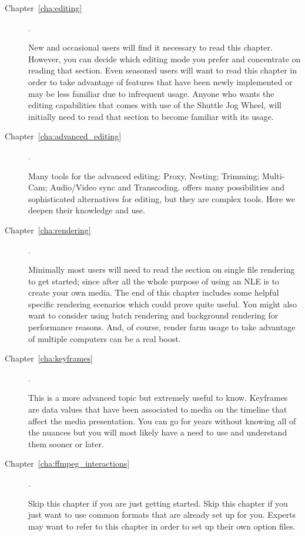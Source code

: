 \begin{description}
    \item[Chapter~\ref{cha:editing}] .

        New and occasional users will find it necessary to read this chapter. However, you can decide which editing mode you prefer and concentrate on reading that section.
        Even seasoned users will want to read this chapter in order to take advantage of features that have been newly implemented or may be less familiar due to infrequent usage.
        Anyone who wants the editing capabilities that comes with use of the Shuttle Jog Wheel, will initially need to read that section to become familiar with its usage.
        
     \item[Chapter~\ref{cha:advanced_editing}] .
     
     	Many tools for the advanced editing: Proxy, Nesting; Trimming; Multi-Cam; Audio/Video sync and Transcoding. \CGG{} offers many possibilities and sophisticated alternatives for editing, but they are complex tools. Here we deepen their knowledge and use.

    \item[Chapter~\ref{cha:rendering}] .

        Minimally most users will need to read the section on single file rendering to get started; since after all the whole purpose of using an NLE is to create your own media.
        The end of this chapter includes some helpful specific rendering scenarios which could prove quite useful.
        You might also want to consider using batch rendering and background rendering for performance reasons.
        And, of course, render farm usage to take advantage of multiple computers can be a real boost.

    \item[Chapter~\ref{cha:keyframes}] .

        This is a more advanced topic but extremely useful to know.
        Keyframes are data values that have been associated to media on the timeline that affect the media presentation.
        You can go for years without knowing all of the nuances but you will most likely have a need to use and understand them sooner or later.

    \item[Chapter~\ref{cha:ffmpeg_interactions}] .

        Skip this chapter if you are just getting started. Skip this chapter if you just want to use common
        formats that are already set up for you. Experts may want to refer to this chapter in order to set up their
        own option files.


\end{description}
